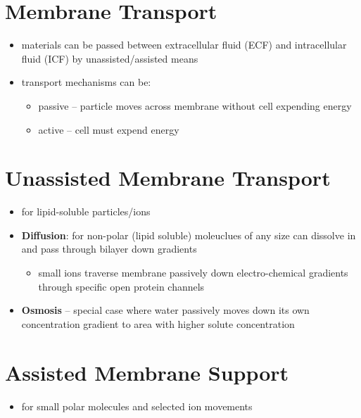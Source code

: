 \documentclass[10pt]{article}
\begin{document}
\section{Membrane Transport}
\begin{itemize}
    \item materials can be passed between extracellular fluid (ECF) and intracellular fluid (ICF) by unassisted/assisted means
    \item transport mechanisms can be: 
        \begin{itemize}
            \item passive -- particle moves across membrane without cell expending energy
            \item active -- cell must expend energy
        \end{itemize}
\end{itemize}


\section{Unassisted Membrane Transport}
\begin{itemize}
    \item for lipid-soluble particles/ions
    \item \textbf{Diffusion}: for non-polar (lipid soluble) moleuclues of any size can dissolve in and pass through bilayer down gradients
        \begin{itemize}
            \item small ions traverse membrane passively down electro-chemical gradients through specific open protein channels
        \end{itemize}
    \item \textbf{Osmosis} -- special case where water passively moves down its own concentration gradient to area with higher solute concentration
\end{itemize}


\section{Assisted Membrane Support}
\begin{itemize}
    \item for small polar molecules and selected ion movements
\end{itemize}
\end{document}
